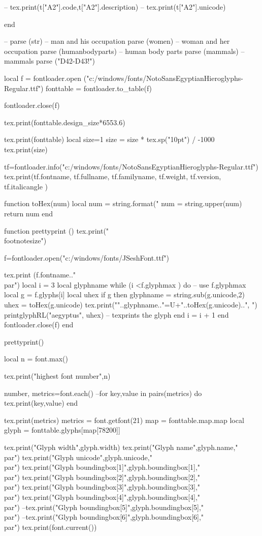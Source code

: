 \documentclass{article}
\begin{document}
\begin{luacode*}
-- tex.print(t["A2"].code,t["A2"].description)
-- tex.print(t["A2"].unicode)

end

-- 
parse (str)            -- man and his occupation
parse (women)          -- woman and her occupation
parse (humanbodyparts) -- human body parts
parse (mammals)        -- mammals
parse ("D42-D43!")

local f = fontloader.open
("c:/windows/fonts/NotoSansEgyptianHieroglyphs-Regular.ttf")
fonttable = fontloader.to_table(f)

fontloader.close(f)


tex.print(fonttable.design_size*6553.6)

tex.print(fonttable)
local size=1
size = size * tex.sp("10pt") / -1000
tex.print(size)

tf=fontloader.info("c:/windows/fonts/NotoSansEgyptianHieroglyphs-Regular.ttf")
tex.print(tf.fontname,
          tf.fullname,
          tf.familyname,
          tf.weight,
          tf.version,
          tf.italicangle
         )

function toHex(num)
  local  num  = string.format("%
         num  = string.upper(num)
  return num
end

function prettyprint ()
tex.print("\\footnotesize")

f=fontloader.open("c:/windows/fonts/JSeshFont.ttf")

tex.print (f.fontname.."\\par")
local i = 3
local glyphname
while (i <f.glyphmax ) do -- use f.glyphmax 
	local g = f.glyphs[i]
	local uhex
	if g then
      glyphname = string.sub(g.unicode,2) 
 	   uhex = toHex(g.unicode)
 		tex.print(""..glyphname.."=U+"..toHex(g.unicode)..", ")
 		printglyphRL("aegyptus", uhex) -- texprints the glyph
	end
  	i = i + 1
end
fontloader.close(f)
end

prettyprint()

local n = font.max()

tex.print("highest font number",n)

number, metrics=font.each()
--for key,value in pairs(metrics) do tex.print(key,value) end

tex.print(metrics)
metrics = font.getfont(21)
map = fonttable.map.map
local glyph = fonttable.glyphs[map[78200]]

tex.print("Glyph width",glyph.width)
tex.print("Glyph name",glyph.name,"\\par")
tex.print("Glyph unicode",glyph.unicode,"\\par")
tex.print("Glyph boundingbox[1]",glyph.boundingbox[1],"\\par")
tex.print("Glyph boundingbox[2]",glyph.boundingbox[2],"\\par")
tex.print("Glyph boundingbox[3]",glyph.boundingbox[3],"\\par")
tex.print("Glyph boundingbox[4]",glyph.boundingbox[4],"\\par")
--tex.print("Glyph boundingbox[5]",glyph.boundingbox[5],"\\par")
--tex.print("Glyph boundingbox[6]",glyph.boundingbox[6],"\\par")
tex.print(font.current())


\end{luacode*}
\end{document}
